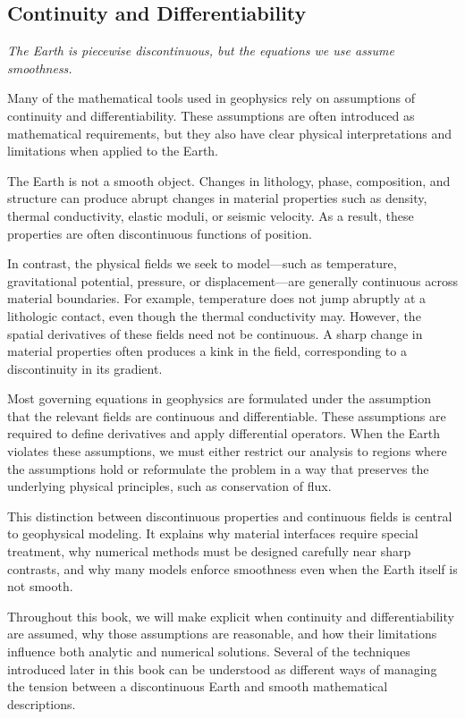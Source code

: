 \subsection{Continuity and Differentiability}

\emph{The Earth is piecewise discontinuous, but the equations we use assume smoothness.}

Many of the mathematical tools used in geophysics rely on assumptions of continuity and differentiability. These assumptions are often introduced as mathematical requirements, but they also have clear physical interpretations and limitations when applied to the Earth.

The Earth is not a smooth object. Changes in lithology, phase, composition, and structure can produce abrupt changes in material properties such as density, thermal conductivity, elastic moduli, or seismic velocity. As a result, these properties are often discontinuous functions of position.

In contrast, the physical fields we seek to model—such as temperature, gravitational potential, pressure, or displacement—are generally continuous across material boundaries. For example, temperature does not jump abruptly at a lithologic contact, even though the thermal conductivity may. However, the spatial derivatives of these fields need not be continuous. A sharp change in material properties often produces a kink in the field, corresponding to a discontinuity in its gradient.

Most governing equations in geophysics are formulated under the assumption that the relevant fields are continuous and differentiable. These assumptions are required to define derivatives and apply differential operators. When the Earth violates these assumptions, we must either restrict our analysis to regions where the assumptions hold or reformulate the problem in a way that preserves the underlying physical principles, such as conservation of flux.

This distinction between discontinuous properties and continuous fields is central to geophysical modeling. It explains why material interfaces require special treatment, why numerical methods must be designed carefully near sharp contrasts, and why many models enforce smoothness even when the Earth itself is not smooth.

Throughout this book, we will make explicit when continuity and differentiability are assumed, why those assumptions are reasonable, and how their limitations influence both analytic and numerical solutions.  Several of the techniques introduced later in this book can be understood as different ways of managing the tension between a discontinuous Earth and smooth mathematical descriptions.

